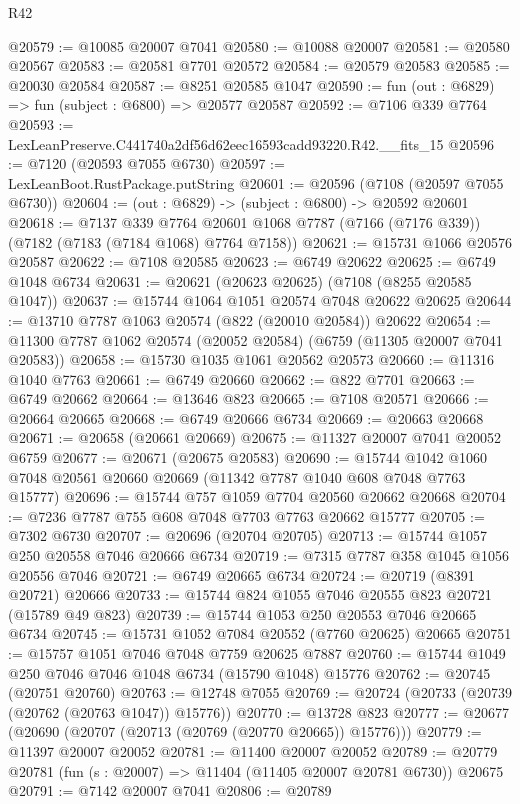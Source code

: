 \begin{lexlean}{R42}
\begin{coremodule}
{@20579 := @10085 @20007 @7041
@20580 := @10088 @20007
@20581 := @20580 @20567
@20583 := @20581 @7701 @20572
@20584 := @20579 @20583
@20585 := @20030 @20584
@20587 := @8251 @20585 @1047
@20590 := fun (out : @6829) => fun (subject : @6800) => @20577 @20587
@20592 := @7106 @339 @7764
@20593 := LexLeanPreserve.C441740a2df56d62eec16593cadd93220.R42.__fits_15
@20596 := @7120 (@20593 @7055 @6730)
@20597 := LexLeanBoot.RustPackage.putString
@20601 := @20596 (@7108 (@20597 @7055 @6730))
@20604 := (out : @6829) -> (subject : @6800) -> @20592 @20601
@20618 := @7137
    @339
    @7764
    @20601
    @1068
    @7787
    (@7166 (@7176 @339))
    (@7182 (@7183 (@7184 @1068) @7764 @7158))
@20621 := @15731 @1066 @20576 @20587
@20622 := @7108 @20585
@20623 := @6749 @20622
@20625 := @6749 @1048 @6734
@20631 := @20621 (@20623 @20625) (@7108 (@8255 @20585 @1047))
@20637 := @15744 @1064 @1051 @20574 @7048 @20622 @20625
@20644 := @13710 @7787 @1063 @20574 (@822 (@20010 @20584)) @20622
@20654 := @11300 @7787 @1062 @20574 (@20052 @20584) (@6759 (@11305 @20007 @7041 @20583))
@20658 := @15730 @1035 @1061 @20562 @20573
@20660 := @11316 @1040 @7763
@20661 := @6749 @20660
@20662 := @822 @7701
@20663 := @6749 @20662
@20664 := @13646 @823
@20665 := @7108 @20571
@20666 := @20664 @20665
@20668 := @6749 @20666 @6734
@20669 := @20663 @20668
@20671 := @20658 (@20661 @20669)
@20675 := @11327 @20007 @7041 @20052 @6759
@20677 := @20671 (@20675 @20583)
@20690 := @15744 @1042 @1060 @7048 @20561 @20660 @20669 (@11342 @7787 @1040 @608 @7048 @7763 @15777)
@20696 := @15744 @757 @1059 @7704 @20560 @20662 @20668
@20704 := @7236 @7787 @755 @608 @7048 @7703 @7763 @20662 @15777
@20705 := @7302 @6730
@20707 := @20696 (@20704 @20705)
@20713 := @15744 @1057 @250 @20558 @7046 @20666 @6734
@20719 := @7315 @7787 @358 @1045 @1056 @20556 @7046
@20721 := @6749 @20665 @6734
@20724 := @20719 (@8391 @20721) @20666
@20733 := @15744 @824 @1055 @7046 @20555 @823 @20721 (@15789 @49 @823)
@20739 := @15744 @1053 @250 @20553 @7046 @20665 @6734
@20745 := @15731 @1052 @7084 @20552 (@7760 @20625) @20665
@20751 := @15757 @1051 @7046 @7048 @7759 @20625 @7887
@20760 := @15744 @1049 @250 @7046 @7046 @1048 @6734 (@15790 @1048) @15776
@20762 := @20745 (@20751 @20760)
@20763 := @12748 @7055
@20769 := @20724 (@20733 (@20739 (@20762 (@20763 @1047)) @15776))
@20770 := @13728 @823
@20777 := @20677 (@20690 (@20707 (@20713 (@20769 (@20770 @20665)) @15776)))
@20779 := @11397 @20007 @20052
@20781 := @11400 @20007 @20052
@20789 := @20779 @20781 (fun (s : @20007) => @11404 (@11405 @20007 @20781 @6730)) @20675
@20791 := @7142 @20007 @7041
@20806 := @20789
}
\end{coremodule}
\end{lexlean}
